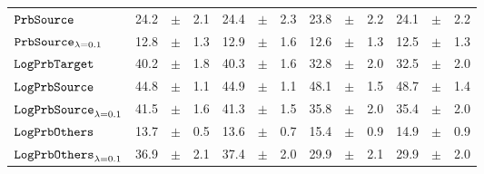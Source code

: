 \documentclass[../main.tex]{subfiles}
\begin{document}
\begin{tabular}{lrrrrrrrrrrrr}
$\mathtt{PrbSource}_{}$                 & 24.2                            & $\pm$                                        & 2.1                        & 24.4                                                                                 & $\pm$ & 2.3                                & 23.8  & $\pm$ & 2.2             & 24.1  & $\pm$ & 2.2                           \\
$\mathtt{PrbSource}_{\lambda=0.1}$      & 12.8                            & $\pm$                                        & 1.3                        & 12.9                                                                                   & $\pm$ & 1.6                                & 12.6  & $\pm$ & 1.3             & 12.5  & $\pm$ & 1.3                           \\
$\mathtt{LogPrbTarget}$                & 40.2                            & $\pm$                                        & 1.8                        & 40.3                                                                                     & $\pm$ & 1.6                                & 32.8  & $\pm$ & 2.0             & 32.5  & $\pm$ & 2.0                           \\
$\mathtt{LogPrbSource}_{}$              & 44.8                            & $\pm$                                        & 1.1                        & 44.9                                                                                   & $\pm$ & 1.1                                & 48.1  & $\pm$ & 1.5             & 48.7  & $\pm$ & 1.4                           \\
$\mathtt{LogPrbSource}_{\lambda=0.1}$   & 41.5                            & $\pm$                                        & 1.6                        & 41.3                                                                                   & $\pm$ & 1.5                                & 35.8  & $\pm$ & 2.0             & 35.4  & $\pm$ & 2.0                           \\
$\mathtt{LogPrbOthers}_{}$              & 13.7                            & $\pm$                                        & 0.5                        & 13.6                                                                                 & $\pm$ & 0.7                                & 15.4  & $\pm$ & 0.9             & 14.9  & $\pm$ & 0.9                           \\
$\mathtt{LogPrbOthers}_{\lambda=0.1}$   & 36.9                            & $\pm$                                        & 2.1                        & 37.4                                                                                   & $\pm$ & 2.0                                & 29.9  & $\pm$ & 2.1             & 29.9  & $\pm$ & 2.0                           \\

\end{tabular}
\end{document}
